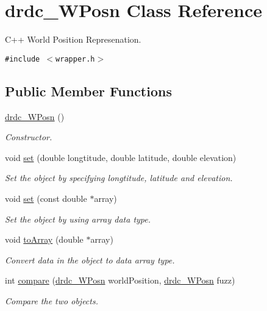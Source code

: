 \hypertarget{classdrdc__WPosn}{
\section{drdc\_\-WPosn Class Reference}
\label{classdrdc__WPosn}
}
C++ World Position Represenation.  


{\tt \#include $<$wrapper.h$>$}

\subsection*{Public Member Functions}
\begin{CompactItemize}
\item 
\hyperlink{classdrdc__WPosn_6b8b3e66b18965be99434cbd494bd79d}{drdc\_\-WPosn} ()
\begin{CompactList}\small\item\em Constructor. \item\end{CompactList}\item 
void \hyperlink{classdrdc__WPosn_3c292a1607fb80b5a8ec3ebfaff212f7}{set} (double longtitude, double latitude, double elevation)
\begin{CompactList}\small\item\em Set the object by specifying longtitude, latitude and elevation. \item\end{CompactList}\item 
void \hyperlink{classdrdc__WPosn_2af599ff4db1922f5b95c1a03d70c0cd}{set} (const double $\ast$array)
\begin{CompactList}\small\item\em Set the object by using array data type. \item\end{CompactList}\item 
void \hyperlink{classdrdc__WPosn_e478f6d6dc986f8a370f888152435b3f}{toArray} (double $\ast$array)
\begin{CompactList}\small\item\em Convert data in the object to data array type. \item\end{CompactList}\item 
int \hyperlink{classdrdc__WPosn_d6c93a1d4a91e10d455250e3d9f61e68}{compare} (\hyperlink{classdrdc__WPosn}{drdc\_\-WPosn} worldPosition, \hyperlink{classdrdc__WPosn}{drdc\_\-WPosn} fuzz)
\begin{CompactList}\small\item\em Compare the two objects. \item\end{CompactList}\item 

\end{CompactItemize}
